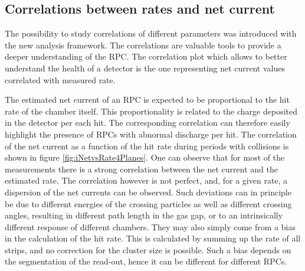 \subsection{Correlations between rates and net current}
The possibility to study correlations of different parameters was introduced with the new analysis framework.
The correlations are valuable tools to provide a deeper understanding of the RPC.
The correlation plot which allows to better understand the health of a detector is the one representing net current values correlated with measured rate.

The estimated net current of an RPC is expected to be proportional to the hit rate of the chamber itself.
This proportionality is related to the charge deposited in the detector per each hit.
The corresponding correlation can therefore easily highlight the presence of RPCs with abnormal discharge per hit.
The correlation of the net current as a function of the hit rate during periods with collisions is shown in figure \ref{fig:iNetvsRate4Planes}.
One can observe that for most of the measurements there is a strong correlation between the net current and the estimated rate. 
The correlation however is not perfect, and, for a given rate, a dispersion of the net currents can be observed.
Such deviations can in principle be due to different energies of the crossing particles as well as different crossing angles, resulting in different path length in the gas gap, or to an intrinsically different response of different chambers.
They may also simply come from a bias in the calculation of the hit rate. 
This is calculated by summing up the rate of all strips, and no correction for the cluster size is possible. 
Such a bias depends on the segmentation of the read-out, hence it can be different for different RPCs.

